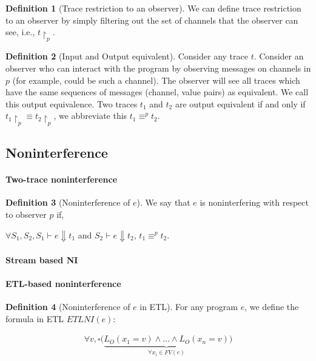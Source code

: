 \documentclass{sig-alternate}
\newcommand{\code}[1]{\text{\lstinline!#1!}}
\theoremstyle{definition}
\newtheorem{defn}{Definition}[section]
\newcommand{\tr}{t}
\newcommand{\talways}{\square}
\begin{document}
{\begin{defn}[Trace restriction to an observer]
  We can define trace restriction to an observer by simply filtering
  out the set of channels that the observer can see, i.e.,
  $\tr\restriction_p$.
\end{defn}

\begin{defn}[Input and Output equivalent]
  Consider any trace $\tr$.  Consider an observer who can interact
  with the program by observing messages on channels in $p$ (for
  example, \code{netout} could be such a channel).  The observer will
  see all traces which have the same sequences of messages (channel,
  value pairs) as equivalent.  We call this output equivalence.  Two
  traces $\tr_1$ and $\tr_2$ are output equivalent if and only if
  $\tr_1\restriction_p \equiv \tr_2\restriction_p$, we abbreviate this
  $\tr_1 \equiv^p \tr_2$.
\end{defn}

\subsection{Noninterference}

\paragraph*{Two-trace noninterference}

\begin{defn}[Noninterference of $e$]
  We say that $e$ is noninterfering with respect to observer $p$ if,
  
  $\forall S_1, S_2, S_1 \vdash e \Downarrow \tr_1$ and $S_2 \vdash e
  \Downarrow \tr_2$, $\tr_1 \equiv^p \tr_2$.
\end{defn}

\paragraph*{Stream based NI}

\paragraph*{ETL-based noninterference}

\begin{defn}[Noninterference of $e$ in ETL]
  For any program $e$, we define the formula in ETL $ETLNI(e)$:

  \begin{displaymath}
    \begin{array}{c}
      \forall v, \talways \big( \underbrace{L_O(x_1 = v) \wedge \ldots \wedge
        L_O(x_n = v)}_{\forall x_i \in FV(e)} \big )
    \end{array}
  \end{displaymath}


\end{defn}}
\end{document}
